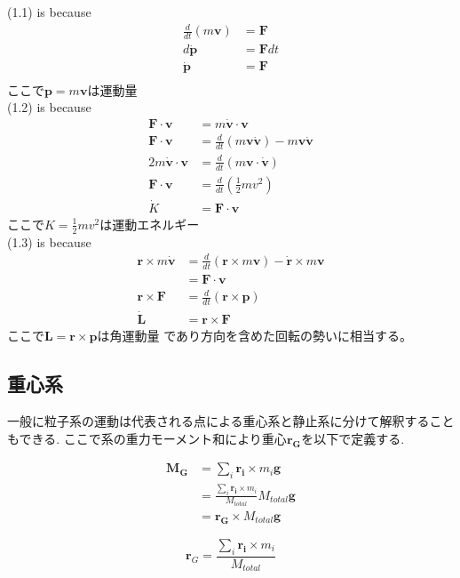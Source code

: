 \documentclass[dvipdfmx]{jsarticle}
\begin{document}
(1.1) is because
\begin{align*}
\frac{d}{dt} (m\bm{v}) &= \bm{F} \\
d\dot{\bm{p}} &= \bm{F}dt \\
\dot{\bm{p}} &= \bm{F} \\
\end{align*}
ここで$\bm{p}=m\bm{v}$は運動量 \\
(1.2) is because
\begin{align*}
\bm{F} \cdot \bm{v} &= m \dot{\bm{v}} \cdot \bm{v} \\
\bm{F} \cdot \bm{v} &= \frac{d}{dt}(m\bm{v}\bm{\dot{v}}) - m\bm{v}\bm{\dot{v}} \\
2m\bm{\dot{v}} \cdot \bm{v} &= \frac{d}{dt}(m\bm{v} \cdot \bm{\dot{v}}) \\
\bm{F} \cdot \bm{v} &= \frac{d}{dt} \left( \frac{1}{2}mv^2 \right) \\
\dot{K} &= \bm{F} \cdot \bm{v}
\end{align*}
ここで$K=\frac{1}{2}mv^2$は運動エネルギー \\
(1.3) is because
\begin{align*}
\bm{r} \times m\bm{\dot{v}} &= \frac{d}{dt}(\bm{r} \times m\bm{v}) - \bm{\dot{r}} \times m\bm{v} \\
&= \bm{F} \cdot \bm{v} \\
\bm{r} \times \bm{F} &= \frac{d}{dt}(\bm{r} \times \bm{p}) \\
\dot{\bm{L}} &= \bm{r} \times \bm{F}
\end{align*}
ここで$\bm{L} = \bm{r} \times \bm{p}$は角運動量
であり方向を含めた回転の勢いに相当する。


\subsection{重心系}
一般に粒子系の運動は代表される点による重心系と静止系に分けて解釈することもできる.
ここで系の重力モーメント和により重心$ \bm{r_G} $を以下で定義する.

\begin{align*}
\bm{M_G} &= \sum_i \bm{r_i} \times m_i \bm{g} \\
&= \frac{\sum_i \bm{r_i} \times m_i}{M_{total}} M_{total} \bm{g} \\
&= \bm{r_G} \times M_{total} \bm{g}
\end{align*}

\begin{defi}
$$\bm{r}_G =  \frac{\sum_i \bm{r_i} \times m_i}{M_{total}}$$
\end{defi}
\end{document}
